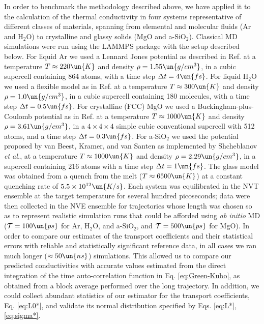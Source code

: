 In order to benchmark the methodology described above, we have applied it to the calculation of the thermal conductivity in four systems representative of different classes of materials, spanning from elemental and molecular fluids (Ar and $\mathrm{H_2O}$) to crystalline and glassy solids (MgO and a-SiO$_2$). Classical MD simulations were run using the LAMMPS package \cite{LAMMPS} with the setup described below. For liquid Ar we used a Lennard Jones potential as described in Ref.  at a temperature $T\approx 220\un{K}$ and density $\rho=1.55\un{g/cm^3}$,  in a cubic supercell containing 864 atoms, with a time step $\Delta t=4\un{fs}$. For liquid H$_2$O we used a flexible model as in Ref.  at a temperature $T\approx 300\un{K}$ and density $\rho=1.0\un{g/cm^3}$, in a cubic supercell containing 180 molecules, with a time step $\Delta t=0.5\un{fs}$. For crystalline (FCC) MgO we used a Buckingham-plus-Coulomb potential as in Ref.  at a temperature $T\approx 1000\un{K}$ and density $\rho=3.61\un{g/cm^3}$, in a $4\times 4\times 4$ simple cubic conventional supercell with 512 atoms, and a time step $\Delta t=0.3\un{fs}$. For  a-SiO$_2$ we used the potential proposed by van Beest, Kramer, and van Santen \cite{Silica-BKS-1990} as implemented by Shcheblanov \emph{et al.},\cite{Silica-BKS-2015} at a temperature $T\approx 1000\un{K}$ and density $\rho=2.29\un{g/cm^3}$,  in a supercell containing 216 atoms with a time step $\Delta t=1\un{fs}$. The glass model was obtained from a quench from the melt ($T\approx 6500\un{K}$) at a constant quenching rate of $5.5\times 10^{12}\un{K/s}$. Each system was equilibrated in the NVT ensemble at the target temperature for several hundred picoseconds; data were then collected in the NVE ensemble for trajectories whose length was chosen so as to represent realistic simulation runs that could be afforded using \emph{ab initio} MD ($\mathcal{T} = 100\un{ps}$ for Ar, H$_2$O, and a-SiO$_2$, and $\mathcal{T} =500\un{ps}$ for MgO). In order to compare our estimates of the transport coefficients and their statistical errors with reliable and statistically significant reference data, in all cases we ran much longer ($\approx 50\un{ns}$) simulations. This allowed us to compare our predicted conductivities with accurate values estimated from the direct  integration of the  time auto-correlation function in Eq. \eqref{eq:Green-Kubo}, as obtained from a block average \cite{Frenkel2001} performed over the long trajectory. In addition, we could collect abundant statistics of our estimator for the transport coefficients, Eq. \eqref{eq:L0*}, and validate its normal distribution specified by Eqs. \eqref{eq:L*}, \eqref{eq:sigma*}. 

